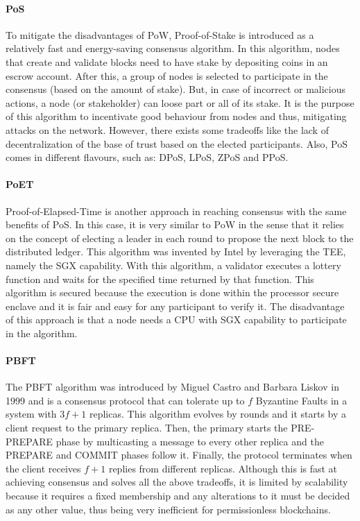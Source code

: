 \paragraph{\gls{PoS}} To mitigate the disadvantages of \gls{PoW}, Proof-of-Stake \cite{pow_vs_pos_eval_performance_and_security} is introduced as a relatively fast and energy-saving consensus algorithm. In this algorithm, nodes that create and validate blocks need to have stake by depositing coins in an escrow account. After this, a group of nodes is selected to participate in the consensus (based on the amount of stake). But, in case of incorrect or malicious actions, a node (or stakeholder) can loose part or all of its stake. It is the purpose of this algorithm to incentivate good behaviour from nodes and thus, mitigating attacks on the network. However, there exists some tradeoffs like the lack of decentralization of the base of trust based on the elected participants. Also, \gls{PoS} comes in different flavours, such as: \gls{DPoS}, \gls{LPoS}, \gls{ZPoS} and \gls{PPoS}. 

\paragraph{\gls{PoET}} Proof-of-Elapsed-Time \cite{poet_security_analysis} is another approach in reaching consensus with the same benefits of \gls{PoS}. In this case, it is very similar to \gls{PoW} in the sense that it relies on the concept of electing a leader in each round to propose the next block to the distributed ledger. This algorithm was invented by Intel by leveraging the \gls{TEE}, namely the \gls{SGX} capability. With this algorithm, a validator executes a lottery function and waits for the specified time returned by that function. This algorithm is secured because the execution is done within the processor secure enclave and it is fair and easy for any participant to verify it. The disadvantage of this approach is that a node needs a \gls{CPU} with \gls{SGX} capability to participate in the algorithm.

\paragraph{\gls{PBFT}} The \gls{PBFT} \cite{pbft} algorithm was introduced by Miguel Castro and Barbara Liskov in 1999 and is a consensus protocol that can tolerate up to $f$ Byzantine Faults in a system with $3f + 1$ replicas. This algorithm evolves by rounds and it starts by a client request to the primary replica. Then, the primary starts the PRE-PREPARE phase by multicasting a message to every other replica and the PREPARE and COMMIT phases follow it. Finally, the protocol terminates when the client receives $f + 1$ replies from different replicas. Although this is fast at achieving consensus and solves all the above tradeoffs, it is limited by scalability because it requires a fixed membership and any alterations to it must be decided as any other value, thus being very inefficient for permissionless blockchains.


